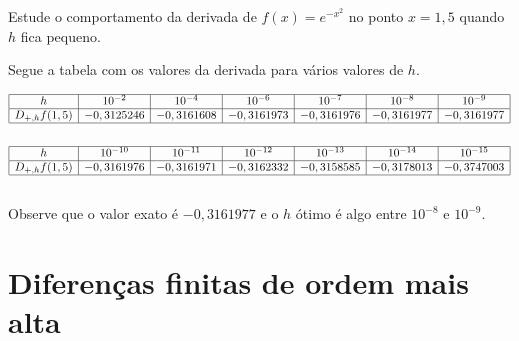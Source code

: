 \begin{exer}Estude o comportamento da derivada de $f(x)=e^{-x^2}$ no ponto $x=1,5$ quando $h$ fica pequeno.
\end{exer}
\begin{resp}
  
Segue a tabela com os valores da derivada para vários valores de $h$.

\begin{equation*}
\begin{array}{|c|c|c|c|c|c|c|}\hline
h&10^{-2}&10^{-4}&10^{-6}&10^{-7}&10^{-8}&10^{-9}\\\hline
D_{+,h}f(1,5)& - 0,3125246&- 0,3161608 &- 0,3161973&- 0,3161976&- 0,3161977&- 0,3161977 \\\hline
\multicolumn{7}{c}{}
\end{array}  
\end{equation*}  
\begin{equation*}
\begin{array}{|c|c|c|c|c|c|c|}\hline
h&10^{-10}&10^{-11}&10^{-12}&10^{-13}&10^{-14}&10^{-15}\\\hline
D_{+,h}f(1,5)&- 0,3161976&- 0,3161971&- 0,3162332&- 0,3158585&- 0,3178013&- 0,3747003\\\hline
\multicolumn{7}{c}{}
\end{array}
\end{equation*}

Observe que o valor exato é $-0,3161977$ e o $h$ ótimo é algo entre $10^{-8}$ e $10^{-9}$.      
  
\end{resp}


\section{Diferenças finitas de ordem mais alta}

